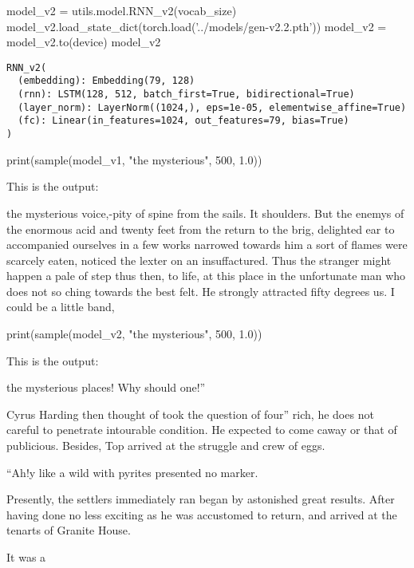 \begin{pythoncode}
model_v2 = utils.model.RNN_v2(vocab_size)
model_v2.load_state_dict(torch.load('../models/gen-v2.2.pth'))
model_v2 = model_v2.to(device)
model_v2
\end{pythoncode}

\begin{verbatim}
RNN_v2(
  (embedding): Embedding(79, 128)
  (rnn): LSTM(128, 512, batch_first=True, bidirectional=True)
  (layer_norm): LayerNorm((1024,), eps=1e-05, elementwise_affine=True)
  (fc): Linear(in_features=1024, out_features=79, bias=True)
)
\end{verbatim}

\begin{pythoncode}
print(sample(model_v1, "the mysterious", 500, 1.0))
\end{pythoncode}

This is the output:

\noindent
the mysterious voice,-pity of spine from the sails. It shoulders. But the enemys of the
enormous acid and twenty feet from the return to the brig, delighted ear to accompanied ourselves in a few
works narrowed towards him a sort of flames were scarcely eaten, noticed the lexter on an insuffactured. Thus the stranger might happen a pale of step thus then, to life, at this place in the unfortunate man who does not so
ching towards the best felt. He strongly attracted fifty degrees us.
I could be a little band,


\begin{pythoncode}
print(sample(model_v2, "the mysterious", 500, 1.0))
\end{pythoncode}

This is the output:

\noindent
the mysterious places! Why should one!”

Cyrus Harding then thought of took the question of four” rich, he does not careful to penetrate intourable condition. He expected to come caway or
that of publicious. Besides, Top arrived at the struggle and crew of eggs.

“Ah!y like a wild with pyrites presented no marker.

Presently, the settlers immediately ran began by astonished great results. After having done no less exciting as he was accustomed to return, and arrived at
the tenarts of Granite House.

It was a